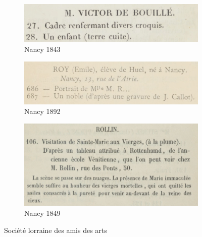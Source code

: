 \documentclass[a4paper,12pt,twoside]{book}
\begin{document}
	\begin{figure}	
		\begin{subfigure}{0.5\textwidth}
			\includegraphics[scale=0.5]{nancy1843.png}
			\centering
			\caption{Nancy 1843}
		\end{subfigure}
		\begin{subfigure}{0.5\textwidth}
			\includegraphics[scale=0.5]{nancy1892.png}
			\centering
			\caption{Nancy 1892}
		\end{subfigure}
		\begin{subfigure}{0.5\textwidth}
			\includegraphics[scale=0.4]{nancy1849.png}
			\centering
			\caption{Nancy 1849}
		\end{subfigure}	
	\caption{Société lorraine des amis des arts}
	\end{figure}
	
\end{document}

